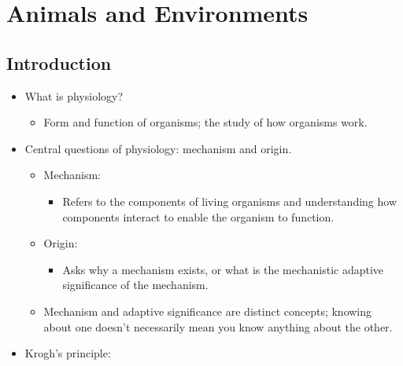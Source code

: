 \documentclass[12pt,a4paper]{article}
\begin{document}
\tableofcontents
\cleardoublepage
\fancyhead{}

\clearpage
{}
\clearpage
\section{Animals and Environments}
\subsection{Introduction}
\begin{itemize}
    \item What is physiology?
        \begin{itemize}
            \item Form and function of organisms; the study of how organisms work.
        \end{itemize}
    \item Central questions of physiology: {\color{o-Sun}mechanism} and {\color{o-Sun}origin}.
        \begin{itemize}
            \item Mechanism:
                \begin{itemize}
                    \item Refers to the {\color{o-Sun}components} of living organisms and understanding {\color{o-Sun}how} components interact to enable the organism to function.
                \end{itemize}
            \item Origin:
                \begin{itemize}
                    \item Asks why a mechanism exists, or {\color{o-Sun}what} is the mechanistic {\color{o-Sun}adaptive significance} of the mechanism.
                \end{itemize}
            \item Mechanism and adaptive significance are distinct concepts; knowing about one doesn't necessarily mean you know anything about the other.
        \end{itemize}
    \item Krogh's principle: \begin{quote}\color{G-Moon}

\end{quote}
\end{itemize}
\end{document}
